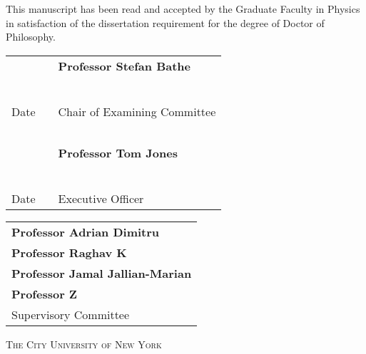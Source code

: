 \begin{center}
This manuscript has been read and accepted by the Graduate Faculty in Physics in satisfaction of the dissertation requirement for the degree of Doctor of Philosophy.
\end{center}

\vspace{0.75in}

\begin{tabular}{p{1.75in}p{0.5in}p{3.5in}}
~                                   & & \textbf{Professor Stefan Bathe}\\
~                                   & & \\
\hrulefill                          & &\hrulefill \\
Date                                & & Chair of Examining Committee\\
~                                   & & \\
~                                   & & \textbf{Professor Tom Jones}\\
~                                   & & \\
\hrulefill                          & &\hrulefill \\
Date                                & & Executive Officer\\
\end{tabular}

\vspace{0.75in}

\begin{tabular}{l}
\textbf{Professor Adrian Dimitru} \\
\textbf{Professor Raghav K} \\
\textbf{Professor Jamal Jallian-Marian} \\
\textbf{Professor Z} \\
Supervisory Committee \\
\end{tabular}


\vspace{\fill}
\begin{center}
\textsc{The City University of New York}
\end{center}
